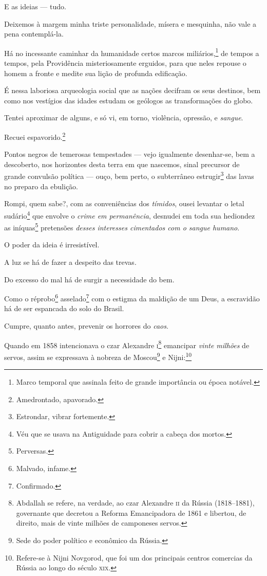 E as ideias --- tudo.

Deixemos à margem minha triste personalidade, mísera e mesquinha, não
vale a pena contemplá-la.

Há no incessante caminhar da humanidade certos marcos
miliários,\footnote{Marco temporal que assinala feito de grande
  importância ou época notável.} de tempos a tempos, pela Providência
misteriosamente erguidos, para que neles repouse o homem a fronte e
medite sua lição de profunda edificação.

É nessa laboriosa arqueologia social que as nações decifram os seus
destinos, bem como nos vestígios das idades estudam os geólogos as
transformações do globo.

Tentei aproximar de alguns, e só vi, em torno, violência, opressão, e
\emph{sangue}.

Recuei espavorido.\footnote{Amedrontado, apavorado.}

Pontos negros de temerosas tempestades --- vejo igualmente desenhar-se,
bem a descoberto, nos horizontes desta terra em que nascemos, sinal
precursor de grande convulsão política --- ouço, bem perto, o subterrâneo
estrugir\footnote{Estrondar, vibrar fortemente.} das lavas no preparo
da ebulição.

Rompi, quem sabe?, com as conveniências dos \emph{tímidos}, ousei
levantar o letal sudário\footnote{Véu que se usava na Antiguidade para
  cobrir a cabeça dos mortos.} que envolve o \emph{crime em
permanência}, desnudei em toda sua hediondez as iníquas\footnote{
  Perversas.} pretensões \emph{desses interesses cimentados com o sangue
humano}.

O poder da ideia é irresistível.

A luz se há de fazer a despeito das trevas.

Do excesso do mal há de surgir a necessidade do bem.

Como o réprobo\footnote{Malvado, infame.} asselado\footnote{
  Confirmado.} com o estigma da maldição de um Deus, a escravidão há de
ser espancada do solo do Brasil.

Cumpre, quanto antes, prevenir os horrores do \emph{caos}.

Quando em 1858 intencionava o czar Alexandre \textsc{i}\footnote{
  Abdallah se refere, na verdade, ao czar Alexandre \textsc{ii} da Rússia
  (1818--1881), governante que decretou a Reforma Emancipadora de 1861 e
  libertou, de direito, mais de vinte milhões de camponeses servos.}
emancipar \emph{vinte milhões} de servos, assim se expressava à nobreza
de Moscou\footnote{Sede do poder político e econômico da Rússia.} e
Nijni:\footnote{Refere-se à Nijni Novgorod, que foi um dos principais
  centros comercias da Rússia ao longo do século \textsc{xix}.}

